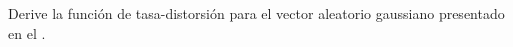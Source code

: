 \documentclass[../../book-main.tex]{subfiles}
\begin{document}
\begin{exercise}\label{exer:KKT}
    Derive la función de tasa-distorsión para el
    vector aleatorio gaussiano presentado en el
    .





\end{exercise}
\end{document}
